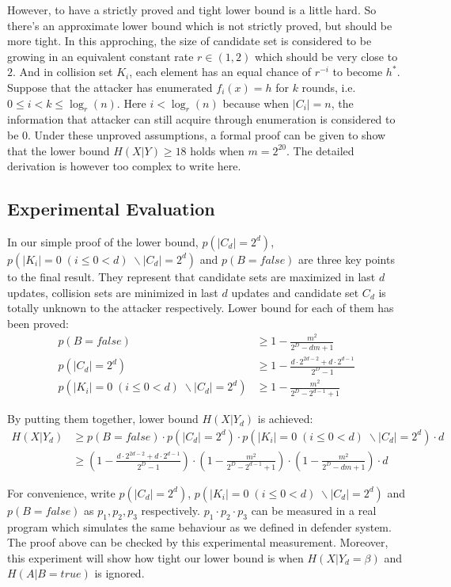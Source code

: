 \documentclass[10pt,a4paper]{article}
\begin{document}
		However, to have a strictly proved and tight lower bound
		is a little hard.
		So there's an approximate lower bound which is not
		strictly proved, but should be more tight.
		In this approching,
		the size of candidate set is
		considered to be growing in an equivalent
		constant rate $r \in (1, 2)$ which
		should be very close to $2$.
		And in collision set $K_i$, each
		element has an equal chance of
		$r^{-i}$ to become $h^*$.
		Suppose that the attacker
		has enumerated $f_i(x) = h$
		for $k$ rounds, i.e. $0 \leq i < k \leq \log_r(n)$. Here
		$i < \log_r(n)$ because when
		$|C_i| = n$, the information that
		attacker can still acquire through
		enumeration is considered to be $0$.
		Under these unproved assumptions,
		a formal proof can be given to show that the lower bound
		$H(X | Y) \geq 18$ holds when $m = 2^{20}$. 
		The detailed derivation is however too complex
		to write here.
		
	\subsection{Experimental Evaluation}
		In our simple proof of the lower bound, $p(|C_d| = 2^d)$,
		$p(|K_i| = 0 \; (i \leq 0 < d) \; \backslash |C_d| = 2^d)$ and $p(B = false)$ are 
		three key points to the final result.
		They represent that candidate sets are maximized in
		last $d$ updates, collision sets are minimized in
		last $d$ updates and candidate set $C_d$ is totally unknown
		to the attacker respectively.
		Lower bound for each of them has been proved:
		\begin{align*}
			p(B = false) &\geq 1-\frac{m^2}{2^D-dm+1}\\
			p(|C_d| = 2^d) &\geq 1-\frac{d \cdot 2^{2d-2}+d \cdot 2^{d-1}}{2^D-1}\\
			p(|K_i| = 0 \; (i \leq 0 < d) \; \backslash |C_d| = 2^d) &\geq 1-\frac{m^2}{2^D-2^{d-1}+1}
		\end{align*}
		
		By putting them together, lower bound $H(X | Y_d)$ is achieved:
		\begin{align*}
			H(X | Y_d) &\geq p(B = false) \cdot p(|C_d| = 2^d) \cdot 
				p(|K_i| = 0 \; (i \leq 0 < d) \; \backslash |C_d| = 2^d) \cdot d\\
				&\geq (1-\frac{d \cdot 2^{2d-2}+d \cdot 2^{d-1}}{2^D-1})
					\cdot (1-\frac{m^2}{2^D-2^{d-1}+1}) 
					\cdot (1-\frac{m^2}{2^D-dm+1}) \cdot d 
		\end{align*}
		
		For convenience, write $p(|C_d| = 2^d)$,
		$p(|K_i| = 0 \; (i \leq 0 < d) \; \backslash |C_d| = 2^d)$ and $p(B = false)$
		as $p_1, p_2, p_3$ respectively. 
		$p_1 \cdot p_2 \cdot p_3$ can be measured in a real program which 
		simulates the same behaviour as we defined in defender system.
		The proof above can be checked by this experimental measurement.
		Moreover, this experiment will show how tight our lower bound is
		when $H(X | Y_d = \beta)$ and $H(A | B = true)$ is ignored.
\end{document}
